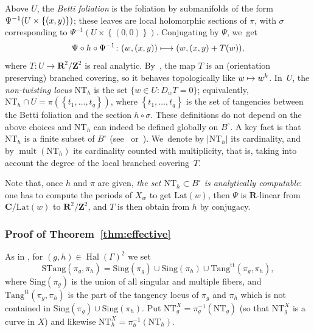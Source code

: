 \documentclass[11pt]{article}
\newcommand\mto{\mathchoice{\longmapsto}{\mapsto}{\mapsto}{\mapsto}}
\let\sep :
\newcommand{\set}[1]{\left\{#1\right\}}
\newcommand{\abs}[1]{\left\vert#1\right\vert}
\newcommand{\inv}{^{-1}}
\DeclareMathOperator{\mult}{mult}
\DeclareMathOperator{\Hal}{Hal}
\def\C{\mathbf{C}}
\def\R{\mathbf{R}}
\def\Z{\mathbf{Z}}
\newcommand{\Lat}{{\mathrm{Lat}}}
\newcommand{\Sing}{{\mathrm{Sing}}}
\newcommand{\Tang}{{\mathrm{Tang}}}
\newcommand{\STang}{{\mathrm{STang}}}
\newcommand{\NT}{{\mathrm{NT}}}
\theoremstyle{plain}
\theoremstyle{definition}
\numberwithin{equation}{section}
\begin{document}
Above $U$, the \emph{Betti foliation} is the foliation by
submanifolds of the form $\Psi\inv(U\times\nobreak \set{(x,y)})$; these leaves are local holomorphic sections of $\pi$, with $\sigma$ corresponding to $\Psi\inv(U\times \set{(0,0)})$.
Conjugating by
$\Psi$, we~get
\begin{equation}\label{eq:definition_T}
\Psi\circ h\circ \Psi^{-1}\colon (w, (x,y))\mto (w, (x,y)+T(w)),
\end{equation}
where $T\colon U\to \R^2/\Z^2$ is real analytic. By~\cite[Lem.\,3.9]{invariant}, the map $T$
is an (orientation preserving)
branched covering, so it behaves topologically like $w\mto w^k$. In~$U$, the
\emph{non-twisting locus} $\mathrm{NT}_{h}$
is the set $\{w\in U\sep  D_wT = 0\}$; equivalently, $\mathrm{NT}_{h }\cap U = \pi(\set{t_1, \ldots , t_q})$, where
$\set{t_1, \ldots , t_q}$ is the set of tangencies between
the Betti foliation and the section $h \circ \sigma$. These definitions do not depend on the above choices and $\mathrm{NT}_{h}$ can indeed be defined globally on $B^\circ$.
A key fact is that $\mathrm{NT}_{h}$ is a finite subset of $B^\circ$
(see~\cite[Prop.\,3.14]{invariant} or~\cite[Cor.\,7.7.10]{duistermaat}). We~denote by $\abs{\NT_h}$ its cardinality, and by $\mult(\NT_h)$
its cardinality counted with multiplicity, that is, taking into account the
degree of the local branched covering~$T$.

Note that, once $h$ and $\pi$ are given, {\textit{the set $\NT_h\subset B^\circ$ is analytically computable}}: one has to compute the periods of $X_w$
to get $\Lat(w)$, then $\Psi$ is $\R$-linear from $\C/\Lat(w)$ to $\R^2/\Z^2$, and $T$ is then obtain from $h$ by conjugacy.

\subsubsection{Proof of Theorem~\ref{thm:effective}}
As in \cite{invariant}, for $(g,h)\in \Hal(\Gamma)^2$
we set
\begin{equation*}
\STang(\pi_g, \pi_h) =
\Sing(\pi_g)\cup\Sing (\pi_h)\cup \Tang^{\mathrm{tt}}(\pi_g, \pi_h),
\end{equation*}
where $\Sing(\pi_g)$ is the union of all singular and multiple fibers, and
$\Tang^{\mathrm{tt}}(\pi_g, \pi_h)$ is the part of the tangency locus of $\pi_g$ and $\pi_h$ which is not contained in $\Sing(\pi_g)\cup\Sing (\pi_h)$.
Put $\NT_g^X=\pi_g^{-1}(\NT_g)$ (so that $\NT_g^X$ is a curve in $X$) and
likewise $\NT_h^X=\pi_h^{-1}(\NT_h)$.
\end{document}
